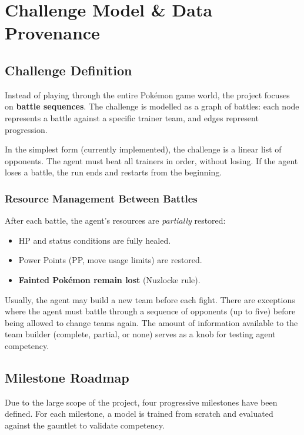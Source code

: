 \chapter{Challenge Model \& Data Provenance}
\label{ch:challenge}

\section{Challenge Definition}

Instead of playing through the entire Pok\'{e}mon game world, the project
focuses on \textbf{battle sequences}.  The challenge is modelled as a graph of
battles: each node represents a battle against a specific trainer team, and
edges represent progression.

In the simplest form (currently implemented), the challenge is a linear list
of opponents.  The agent must beat all trainers in order, without losing.  If
the agent loses a battle, the run ends and restarts from the beginning.

\subsection{Resource Management Between Battles}

After each battle, the agent's resources are \emph{partially} restored:

\begin{itemize}
  \item HP and status conditions are fully healed.
  \item Power Points (PP, move usage limits) are restored.
  \item \textbf{Fainted Pok\'{e}mon remain lost} (Nuzlocke rule).
\end{itemize}

Usually, the agent may build a new team before each fight.  There are
exceptions where the agent must battle through a sequence of opponents (up to
five) before being allowed to change teams again.  The amount of information
available to the team builder (complete, partial, or none) serves as a knob
for testing agent competency.

\section{Milestone Roadmap}

Due to the large scope of the project, four progressive milestones have been
defined.  For each milestone, a model is trained from scratch and evaluated
against the gauntlet to validate competency.

